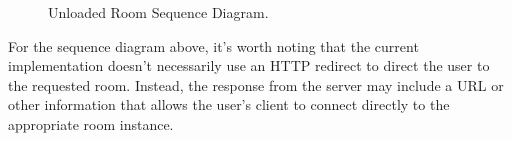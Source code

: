  \begin{figure}[!htb]
  \centering
  \caption{\label{Figure::unloaded-room} Unloaded Room Sequence Diagram.}
\end{figure}

For the sequence diagram above, it's worth noting that the current implementation doesn't necessarily use an HTTP 
redirect to direct the user to the requested room. Instead, the response from the server may include a URL or other
information that allows the user's client to connect directly to the appropriate room instance.